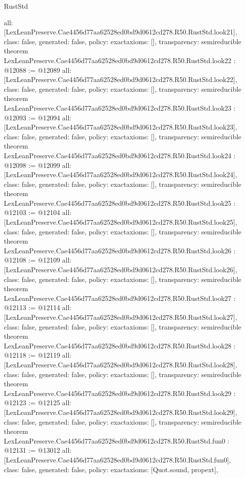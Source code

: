 \begin{lexlean}{RustStd}
\begin{coremodule}
{  all: [LexLeanPreserve.Cae4456d77aa62528ed0bd9d0612cd278.R50.RustStd.look21],
  class: false,
  generated: false,
  policy: exact{axioms: []},
  transparency: semireducible
}
theorem LexLeanPreserve.Cae4456d77aa62528ed0bd9d0612cd278.R50.RustStd.look22 : @12088 := @12089 {
  all: [LexLeanPreserve.Cae4456d77aa62528ed0bd9d0612cd278.R50.RustStd.look22],
  class: false,
  generated: false,
  policy: exact{axioms: []},
  transparency: semireducible
}
theorem LexLeanPreserve.Cae4456d77aa62528ed0bd9d0612cd278.R50.RustStd.look23 : @12093 := @12094 {
  all: [LexLeanPreserve.Cae4456d77aa62528ed0bd9d0612cd278.R50.RustStd.look23],
  class: false,
  generated: false,
  policy: exact{axioms: []},
  transparency: semireducible
}
theorem LexLeanPreserve.Cae4456d77aa62528ed0bd9d0612cd278.R50.RustStd.look24 : @12098 := @12099 {
  all: [LexLeanPreserve.Cae4456d77aa62528ed0bd9d0612cd278.R50.RustStd.look24],
  class: false,
  generated: false,
  policy: exact{axioms: []},
  transparency: semireducible
}
theorem LexLeanPreserve.Cae4456d77aa62528ed0bd9d0612cd278.R50.RustStd.look25 : @12103 := @12104 {
  all: [LexLeanPreserve.Cae4456d77aa62528ed0bd9d0612cd278.R50.RustStd.look25],
  class: false,
  generated: false,
  policy: exact{axioms: []},
  transparency: semireducible
}
theorem LexLeanPreserve.Cae4456d77aa62528ed0bd9d0612cd278.R50.RustStd.look26 : @12108 := @12109 {
  all: [LexLeanPreserve.Cae4456d77aa62528ed0bd9d0612cd278.R50.RustStd.look26],
  class: false,
  generated: false,
  policy: exact{axioms: []},
  transparency: semireducible
}
theorem LexLeanPreserve.Cae4456d77aa62528ed0bd9d0612cd278.R50.RustStd.look27 : @12113 := @12114 {
  all: [LexLeanPreserve.Cae4456d77aa62528ed0bd9d0612cd278.R50.RustStd.look27],
  class: false,
  generated: false,
  policy: exact{axioms: []},
  transparency: semireducible
}
theorem LexLeanPreserve.Cae4456d77aa62528ed0bd9d0612cd278.R50.RustStd.look28 : @12118 := @12119 {
  all: [LexLeanPreserve.Cae4456d77aa62528ed0bd9d0612cd278.R50.RustStd.look28],
  class: false,
  generated: false,
  policy: exact{axioms: []},
  transparency: semireducible
}
theorem LexLeanPreserve.Cae4456d77aa62528ed0bd9d0612cd278.R50.RustStd.look29 : @12123 := @12125 {
  all: [LexLeanPreserve.Cae4456d77aa62528ed0bd9d0612cd278.R50.RustStd.look29],
  class: false,
  generated: false,
  policy: exact{axioms: []},
  transparency: semireducible
}
theorem LexLeanPreserve.Cae4456d77aa62528ed0bd9d0612cd278.R50.RustStd.fun0 : @12131 := @13012 {
  all: [LexLeanPreserve.Cae4456d77aa62528ed0bd9d0612cd278.R50.RustStd.fun0],
  class: false,
  generated: false,
  policy: exact{axioms: [Quot.sound, propext]},
}
\end{coremodule}
\end{lexlean}
